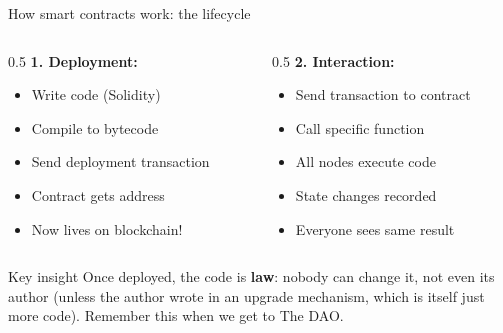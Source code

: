 \ifdefined\PRESENTATION\else\PassOptionsToClass{handout}{beamer}\fi\documentclass[aspectratio=169, lualatex]{beamer}
\begin{document}
\begin{frame}{How smart contracts work: the lifecycle}
	\begin{columns}[c]
		\begin{column}{0.5\textwidth}
			\textbf{1. Deployment:}
			\begin{itemize}
				\item Write code (Solidity)
				\item Compile to bytecode
				\item Send deployment transaction
				\item Contract gets address
				\item Now lives on blockchain!
			\end{itemize}
		\end{column}
		\begin{column}{0.5\textwidth}
			\textbf{2. Interaction:}
			\begin{itemize}
				\item Send transaction to contract
				\item Call specific function
				\item All nodes execute code
				\item State changes recorded
				\item Everyone sees same result
			\end{itemize}
		\end{column}
	\end{columns}
	\vspace{1em}
	\begin{alertblock}{Key insight}
		Once deployed, the code is \textbf{law}: nobody can change it, not even its author (unless the author wrote in an upgrade mechanism, which is itself just more code). Remember this when we get to The DAO.
	\end{alertblock}
\end{frame}
\end{document}
